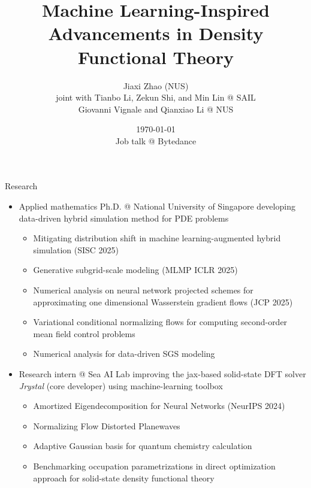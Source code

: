 \documentclass[aspectratio=169]{beamer}
\title[ML4DFT]{Machine Learning-Inspired Advancements in Density Functional Theory}
\author[J. Zhao]{Jiaxi Zhao (NUS) \\ joint with Tianbo Li, Zekun Shi, and Min Lin
@ SAIL\\
Giovanni Vignale and Qianxiao Li @ NUS}
\date[\today]{\today\\
Job talk @ Bytedance}
\begin{document}

\begin{frame}
\titlepage
\end{frame}


\begin{frame}{Research}
	\begin{itemize}
		\item Applied mathematics Ph.D. @ National University of Singapore
		developing data-driven hybrid simulation method for PDE problems
		\begin{itemize}
			\item {\scriptsize \color{red} Mitigating distribution shift in machine learning-augmented hybrid simulation (SISC 2025)}
			\item {\scriptsize \color{red} Generative subgrid-scale modeling (MLMP ICLR 2025)}
			\item {\scriptsize Numerical analysis on neural network projected schemes for approximating one dimensional Wasserstein gradient flows (JCP 2025)}
			\item {\scriptsize Variational conditional normalizing flows for computing second-order mean field control problems}
			\item {\scriptsize Numerical analysis for data-driven SGS modeling}
		\end{itemize}
		\item Research intern @ Sea AI Lab improving the jax-based
		solid-state DFT solver \textit{Jrystal} (core developer) using machine-learning toolbox
		\begin{itemize}
			\item {\scriptsize Amortized Eigendecomposition for Neural Networks (NeurIPS 2024)}
			\item {\scriptsize \color{red} Normalizing Flow Distorted Planewaves}
			\item {\scriptsize \color{red} Adaptive Gaussian basis for quantum chemistry calculation}
			\item {\scriptsize Benchmarking occupation parametrizations in direct optimization approach for solid-state density functional theory}
		\end{itemize}
	\end{itemize}
\end{frame}


\end{document}
